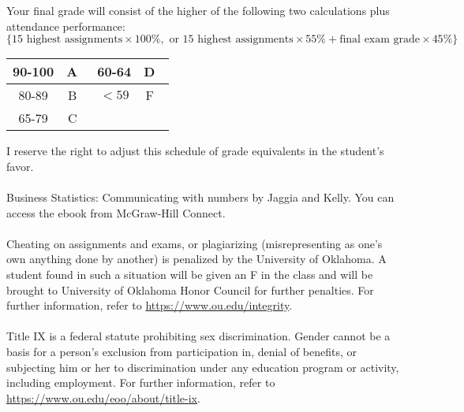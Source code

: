 \documentclass[12pt,letterpaper]{article}
\begin{document}
Your final grade will consist of the higher of the following two calculations plus attendance performance:
$$\{\text{15 highest assignments}\times100\%,\text{ or 15 highest assignments}\times55\%+\text{final exam grade}\times45\%\}$$

\begin{center}
	\begin{tabular}{|c|c|c|c|}
		\hline
		90-100 & A\quad \ &  60-64&  D\quad \ \\ \hline
		80-89& B\quad \ &  $<59$ & F\quad \ \\ \hline
		65-79& C\quad \ &   &   \\ \hline
	\end{tabular}
\end{center}
I reserve the right to adjust this schedule of grade equivalents in the student’s favor.\bigskip\\
\medskip\\
Business Statistics: Communicating with numbers by Jaggia and Kelly. You can access the ebook from McGraw-Hill Connect.\bigskip\\
\medskip\\
Cheating on assignments and exams, or plagiarizing (misrepresenting as one’s own anything done by another) is penalized by the University of Oklahoma. A student found in such a situation will be given an F in the class and will be brought to University of Oklahoma Honor Council for further penalties. For further information, refer to \href{https://www.ou.edu/integrity}{https://www.ou.edu/integrity}.\bigskip\\
\medskip\\
Title IX is a federal statute prohibiting sex discrimination. Gender cannot be a basis for a person’s exclusion from participation in, denial of benefits, or subjecting him or her to discrimination under any education program or activity, including employment. For further information, refer to \href{https://www.ou.edu/eoo/about/title-ix}{https://www.ou.edu/eoo/about/title-ix}.\bigskip\\
\medskip\\
\end{document}
